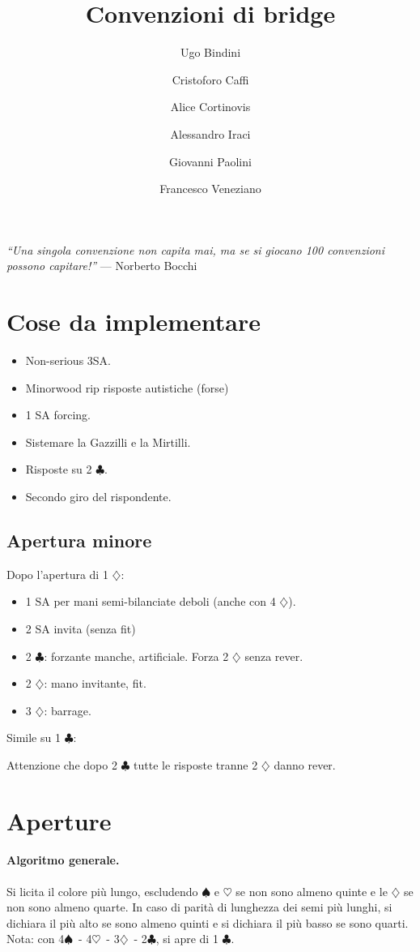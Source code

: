 \documentclass[a4paper,10pt]{article}
\title{Convenzioni di bridge}
\author{Ugo Bindini \and Cristoforo Caffi \and Alice Cortinovis \and Alessandro Iraci \and Giovanni Paolini \and Francesco Veneziano}
\renewcommand{\c}{$\clubsuit$\xspace}
\renewcommand{\d}{$\diamondsuit$\xspace}
\newcommand{\h}{$\heartsuit$\xspace}
\newcommand{\s}{$\spadesuit$\xspace}
\newcommand{\sa}{SA\xspace}
\newcommand{\nt}{SA\xspace}
\begin{document}
\maketitle


\tableofcontents

\pagebreak

\emph{``Una singola convenzione non capita mai, ma se si giocano 100 convenzioni possono capitare!''} --- Norberto Bocchi

\section{Cose da implementare}
\begin{itemize}
	\item Non-serious 3\sa.
	\item Minorwood rip risposte autistiche (forse)
	\item 1 \nt forcing.
	\item Sistemare la Gazzilli e la Mirtilli.
	\item Risposte su 2 \c.
	\item Secondo giro del rispondente.
\end{itemize}

\subsection{Apertura minore}

Dopo l'apertura di 1 \d:
\begin{itemize}
	\item 1 \nt per mani semi-bilanciate deboli (anche con 4 \d). 
	\item 2 \nt invita (senza fit)
	\item 2 \c: forzante manche, artificiale. Forza 2 \d senza rever.
	\item 2 \d: mano invitante, fit.
	\item 3 \d: barrage.
\end{itemize}

Simile su 1 \c:

Attenzione che dopo 2 \c tutte le risposte tranne 2 \d danno rever.

\section{Aperture}

\paragraph{Algoritmo generale.}
Si licita il colore più lungo, escludendo \s e \h se non sono almeno quinte e le \d se non sono almeno quarte.
In caso di parità di lunghezza dei semi più lunghi, si dichiara il più alto se sono almeno quinti e si dichiara il più basso se sono quarti.
Nota: con 4\s\ - 4\h\ - 3\d\ - 2\c, si apre di 1 \c.
\end{document}

